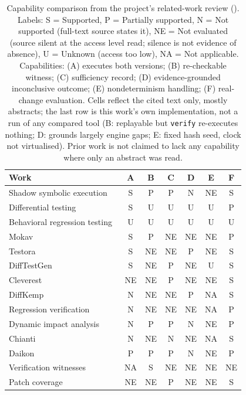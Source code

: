 \begin{table}[t]
\centering\scriptsize
\caption{Capability comparison from the project's related-work review (). Labels: S = Supported, P = Partially supported, N = Not supported (full-text source states it), NE = Not evaluated (source silent at the access level read; silence is not evidence of absence), U = Unknown (access too low), NA = Not applicable. Capabilities: (A) executes both versions; (B) re-checkable witness; (C) sufficiency record; (D) evidence-grounded inconclusive outcome; (E) nondeterminism handling; (F) real-change evaluation. Cells reflect the cited text only, mostly abstracts; the last row is this work's own implementation, not a run of any compared tool (B: replayable but \texttt{verify} re-executes nothing; D: grounds largely engine gaps; E: fixed hash seed, clock not virtualised). Prior work is not claimed to lack any capability where only an abstract was read.}
\label{tab:capability}
\begin{tabular}{lcccccc}
\hline
Work & A & B & C & D & E & F \\
\hline
Shadow symbolic execution~\cite{palikareva2016} & S & P & P & N & NE & S \\
Differential testing~\cite{evans2007} & S & U & U & U & U & P \\
Behavioral regression testing~\cite{jin2010automated} & U & U & U & U & U & U \\
Mokav~\cite{etemadi2024mokav} & S & P & NE & NE & NE & P \\
Testora~\cite{pradel2025testora} & S & NE & NE & P & NE & S \\
DiffTestGen~\cite{hu2026difftestgen} & S & NE & P & NE & U & S \\
Cleverest~\cite{liu2025evaluating} & NE & NE & P & NE & NE & S \\
DiffKemp~\cite{malik2021} & N & NE & NE & P & NA & S \\
Regression verification~\cite{felsing2014} & N & NE & NE & NE & NA & P \\
Dynamic impact analysis~\cite{law2003,orso2003} & N & P & P & N & NE & P \\
Chianti~\cite{ren2004} & N & NE & N & NE & NA & S \\
Daikon~\cite{ernst2001} & P & P & P & N & NE & P \\
Verification witnesses~\cite{beyer2022verification} & NA & S & NE & NE & NE & NE \\
Patch coverage~\cite{hilton2018a} & NE & NE & P & NE & NE & S \\

\end{tabular}
\end{table}
